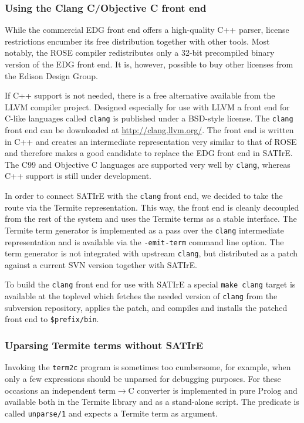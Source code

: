 \documentclass[10pt,twoside]{scrreprt}
\begin{document}
\subsubsection{Using the Clang C/Objective C front end}
While the commercial EDG front end offers a high-quality C++ parser,
license restrictions encumber its free distribution together with
other tools. Most notably, the ROSE compiler redistributes only a
32-bit precompiled binary version of the EDG front end. It is,
however, possible to buy other licenses from the Edison Design Group.

If C++ support is not needed, there is a free alternative available
from the LLVM compiler project. Designed especially for use with LLVM
a front end for C-like languages called \texttt{clang} is published
under a BSD-style license. The \texttt{clang} front end can be
downloaded at \url{http://clang.llvm.org/}. The front end is written
in C++ and creates an intermediate representation very similar to that
of ROSE and therefore makes a good candidate to replace the EDG front
end in SATIrE. The C99 and Objective C languages are supported very
well by \texttt{clang}, whereas C++ support is still under
development.

In order to connect SATIrE with the \texttt{clang} front end, we
decided to take the route via the Termite representation. This way,
the front end is cleanly decoupled from the rest of the system and
uses the Termite terms as a stable interface. The Termite term
generator is implemented as a pass over the \texttt{clang}
intermediate representation and is available via the
\verb|-emit-term| command line option. The term generator is not
integrated with upstream \texttt{clang}, but distributed as a patch
against a current SVN version together with SATIrE. 

To build the \texttt{clang} front end for use with SATIrE a special
\verb|make clang| target is available at the toplevel which fetches
the needed version of \texttt{clang} from the subversion repository,
applies the patch, and compiles and installs the patched front end to
\verb|$prefix/bin|.

\subsubsection{Uparsing Termite terms without SATIrE}
Invoking the \texttt{term2c} program is sometimes too cumbersome, for
example, when only a few expressions should be unparsed for debugging
purposes. For these occasions an independent term$\rightarrow$C
converter is implemented in pure Prolog and available both in the
Termite library and as a stand-alone script. The predicate is called
\verb|unparse/1| and expects a Termite term as argument.
\end{document}
